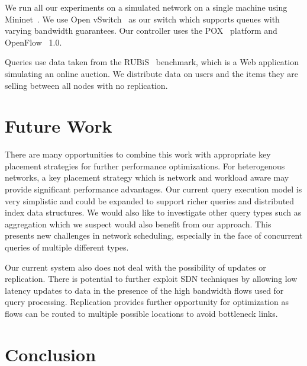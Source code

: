 \documentclass{sig-alternate-2013}
\begin{document}
We run all our experiments on a simulated network on a single machine using Mininet~\cite{Lantz2010}.
We use Open vSwitch~\cite{Pfaff2009} as our switch which supports queues with varying bandwidth guarantees.
Our controller uses the POX~\cite{Gude2008} platform and OpenFlow~\cite{McKeown2008} 1.0.

Queries use data taken from the RUBiS~\cite{Cecchet2002} benchmark, which is a Web application simulating an online auction.
We distribute data on users and the items they are selling between all nodes with no replication.

\section{Future Work}

There are many opportunities to combine this work with appropriate key placement strategies for further performance optimizations.
For heterogenous networks, a key placement strategy which is network and workload aware may provide significant performance advantages.
Our current query execution model is very simplistic and could be expanded to support richer queries and distributed index data structures.
We would also like to investigate other query types such as aggregation which we suspect would also benefit from our approach.
This presents new challenges in network scheduling, especially in the face of concurrent queries of multiple different types.

Our current system also does not deal with the possibility of updates or replication.
There is potential to further exploit SDN techniques by allowing low latency updates to data in the presence of the high bandwidth flows used for query processing.
Replication provides further opportunity for optimization as flows can be routed to multiple possible locations to avoid bottleneck links.

\section{Conclusion}

\let\theOLDbibliography\thebibliography\renewcommand{\thebibliography}[1]{\theOLDbibliography{#1}%
\item[]\vspace*{0.5mm}}


{\scriptsize

}
\end{document}
